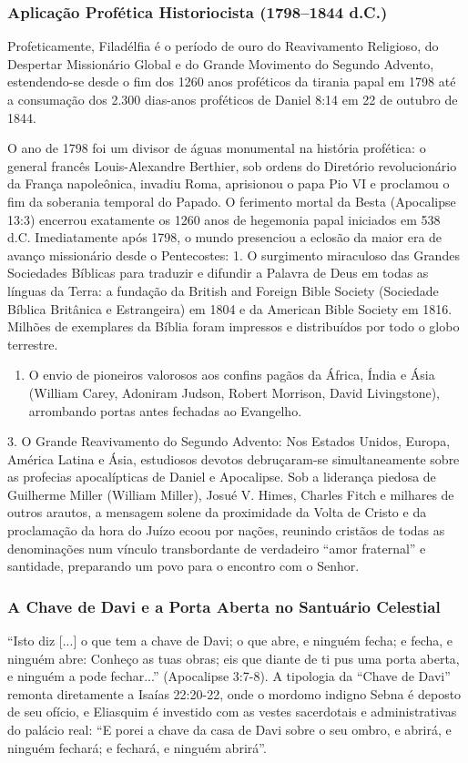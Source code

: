 \subsubsection*{Aplicação Profética Historiocista (1798–1844 d.C.)}
Profeticamente, Filadélfia é o período de ouro do Reavivamento Religioso, do Despertar Missionário Global e do Grande Movimento do Segundo Advento, estendendo-se desde o fim dos 1260 anos proféticos da tirania papal em 1798 até a consumação dos 2.300 dias-anos proféticos de Daniel 8:14 em 22 de outubro de 1844.

O ano de 1798 foi um divisor de águas monumental na história profética: o general francês Louis-Alexandre Berthier, sob ordens do Diretório revolucionário da França napoleônica, invadiu Roma, aprisionou o papa Pio VI e proclamou o fim da soberania temporal do Papado. O ferimento mortal da Besta (Apocalipse 13:3) encerrou exatamente os 1260 anos de hegemonia papal iniciados em 538 d.C. Imediatamente após 1798, o mundo presenciou a eclosão da maior era de avanço missionário desde o Pentecostes:
1. O surgimento miraculoso das Grandes Sociedades Bíblicas para traduzir e difundir a Palavra de Deus em todas as línguas da Terra: a fundação da British and Foreign Bible Society (Sociedade Bíblica Britânica e Estrangeira) em 1804 e da American Bible Society em 1816. Milhões de exemplares da Bíblia foram impressos e distribuídos por todo o globo terrestre.
\begin{enumerate}
  \item O envio de pioneiros valorosos aos confins pagãos da África, Índia e Ásia (William Carey, Adoniram Judson, Robert Morrison, David Livingstone), arrombando portas antes fechadas ao Evangelho.
\end{enumerate}

3. O Grande Reavivamento do Segundo Advento: Nos Estados Unidos, Europa, América Latina e Ásia, estudiosos devotos debruçaram-se simultaneamente sobre as profecias apocalípticas de Daniel e Apocalipse. Sob a liderança piedosa de Guilherme Miller (William Miller), Josué V. Himes, Charles Fitch e milhares de outros arautos, a mensagem solene da proximidade da Volta de Cristo e da proclamação da hora do Juízo ecoou por nações, reunindo cristãos de todas as denominações num vínculo transbordante de verdadeiro ``amor fraternal'' e santidade, preparando um povo para o encontro com o Senhor.


\subsubsection*{A Chave de Davi e a Porta Aberta no Santuário Celestial}
``Isto diz [...] o que tem a chave de Davi; o que abre, e ninguém fecha; e fecha, e ninguém abre: Conheço as tuas obras; eis que diante de ti pus uma porta aberta, e ninguém a pode fechar...'' (Apocalipse 3:7-8).
A tipologia da ``Chave de Davi'' remonta diretamente a Isaías 22:20-22, onde o mordomo indigno Sebna é deposto de seu ofício, e Eliasquim é investido com as vestes sacerdotais e administrativas do palácio real: ``E porei a chave da casa de Davi sobre o seu ombro, e abrirá, e ninguém fechará; e fechará, e ninguém abrirá''.

